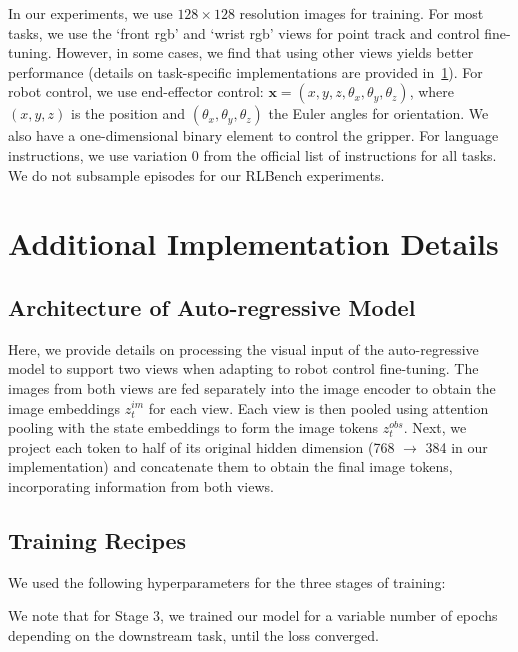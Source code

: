 In our experiments, we use $128 \times 128$ resolution images for training. For most tasks, we use the `front rgb' and `wrist rgb' views for point track and control fine-tuning. However, in some cases, we find that using other views yields better performance (details on task-specific implementations are provided in~\cref{supp:impl}). For robot control, we use end-effector control: $\mathbf{x}=(x, y, z, \theta_x, \theta_y, \theta_z)$, where \((x, y, z)\) is the position and \((\theta_x, \theta_y, \theta_z)\)  the Euler angles for orientation. We also have a one-dimensional binary element to control the gripper. For language instructions, we use variation 0 from the official list of instructions for all tasks. We do not subsample episodes for our RLBench experiments.



\section{Additional Implementation Details}
\label{supp:impl}

\subsection{Architecture of Auto-regressive Model} \label{supp:2_views}
Here, we provide details on processing the visual input of the auto-regressive model to support two views when adapting to robot control fine-tuning. The images from both views are fed separately into the image encoder to obtain the image embeddings $z_t^{im}$ for each view. Each view is then pooled using attention pooling with the state embeddings to form the image tokens $z_t^{obs}$. Next, we project each token to half of its original hidden dimension (768 $\rightarrow$ 384 in our implementation) and concatenate them to obtain the final image tokens, incorporating information from both views.



\subsection{Training Recipes} \label{supp:training_recipe}
We used the following hyperparameters for the three stages of training:


We note that for Stage 3, we trained our model for a variable number of epochs depending on the downstream task, until the loss converged.


